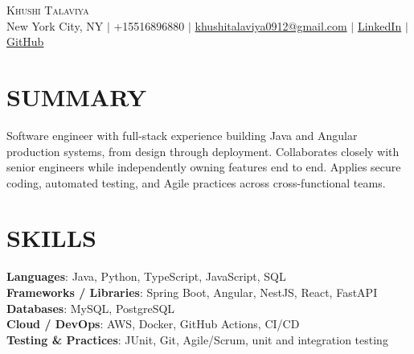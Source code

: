 \documentclass[letterpaper,11pt]{article}
\begin{document}
\begin{center}
    {\Huge \scshape Khushi Talaviya} \\ \vspace{2pt}
    \vspace{4pt}
    \small
    New York City, NY $|$
    \small
    +15516896880 $|$
    \href{mailto:khushitalaviya0912@gmail.com}{khushitalaviya0912@gmail.com} $|$
    \href{https://www.linkedin.com/in/khushitalaviya/}{LinkedIn} $|$
    \href{https://github.com/talaviyakhushi}{GitHub}
\end{center}

\section{SUMMARY}
\vspace{5pt}
\small{Software engineer with full-stack experience building Java and Angular production systems, from design through deployment. Collaborates closely with senior engineers while independently owning features end to end. Applies secure coding, automated testing, and Agile practices across cross-functional teams.}

\vspace{2pt}
\section{SKILLS}
\vspace{5pt}
\begin{itemize}[leftmargin=0in, label={}]
\small{\item{
\textbf{Languages}{: Java, Python, TypeScript, JavaScript, SQL} \\
\textbf{Frameworks / Libraries}{: Spring Boot, Angular, NestJS, React, FastAPI} \\
\textbf{Databases}{: MySQL, PostgreSQL} \\
\textbf{Cloud / DevOps}{: AWS, Docker, GitHub Actions, CI/CD} \\
\textbf{Testing \& Practices}{: JUnit, Git, Agile/Scrum, unit and integration testing}
}}
\end{itemize}
\vspace{-10pt}

\end{document}

